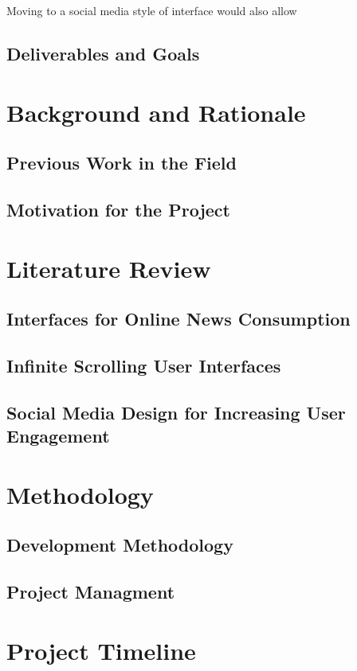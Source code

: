 \documentclass[12pt,titlepage]{article}
\begin{document}
  Moving to a social media style of interface would also allow

  \subsection{Deliverables and Goals}

\section{Background and Rationale}

  \subsection{Previous Work in the Field}

  \subsection{Motivation for the Project}

\section{Literature Review}

  \subsection{Interfaces for Online News Consumption}

  \subsection{Infinite Scrolling User Interfaces}

  \subsection{Social Media Design for Increasing User Engagement}

\section{Methodology}

  \subsection{Development Methodology}

  \subsection{Project Managment}

\section{Project Timeline}

{}

\end{document}
